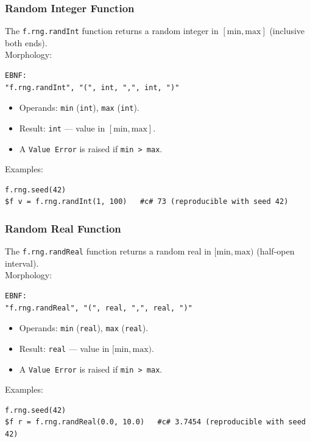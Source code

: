 \subsubsection{Random Integer Function}
The \texttt{f.rng.randInt} function returns a random integer in $[\text{min}, \text{max}]$ (inclusive both ends). \\
Morphology:
\begin{verbatim}
EBNF:
"f.rng.randInt", "(", int, ",", int, ")"
\end{verbatim}
\begin{itemize}
\item Operands: \texttt{min} (\texttt{int}), \texttt{max} (\texttt{int}).
\item Result: \texttt{int} --- value in $[\text{min}, \text{max}]$.
\item A \texttt{Value Error} is raised if \texttt{min > max}.
\end{itemize}
Examples:
\begin{verbatim}
f.rng.seed(42)
$f v = f.rng.randInt(1, 100)   #c# 73 (reproducible with seed 42)
\end{verbatim}

\subsubsection{Random Real Function}
The \texttt{f.rng.randReal} function returns a random real in $[\text{min}, \text{max})$ (half-open interval). \\
Morphology:
\begin{verbatim}
EBNF:
"f.rng.randReal", "(", real, ",", real, ")"
\end{verbatim}
\begin{itemize}
\item Operands: \texttt{min} (\texttt{real}), \texttt{max} (\texttt{real}).
\item Result: \texttt{real} --- value in $[\text{min}, \text{max})$.
\item A \texttt{Value Error} is raised if \texttt{min > max}.
\end{itemize}
Examples:
\begin{verbatim}
f.rng.seed(42)
$f r = f.rng.randReal(0.0, 10.0)   #c# 3.7454 (reproducible with seed 42)
\end{verbatim}


